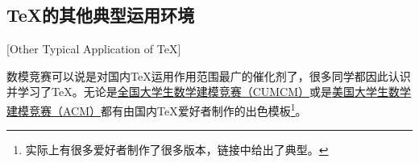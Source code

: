 \subsection{\TeX 的其他典型运用环境}[Other Typical Application of \TeX]

数模竞赛可以说是对国内\TeX 运用作用范围最广的催化剂了，很多同学都因此认识并学习了\TeX 。无论是\href{https://github.com/latexstudio/CUMCMThesis}{全国大学生数学建模竞赛（CUMCM）}或是\href{http://www.latexstudio.net/archives/25}{美国大学生数学建模竞赛（ACM）}都有由国内\TeX 爱好者制作的出色模板\footnote{实际上有很多爱好者制作了很多版本，链接中给出了典型。}。
